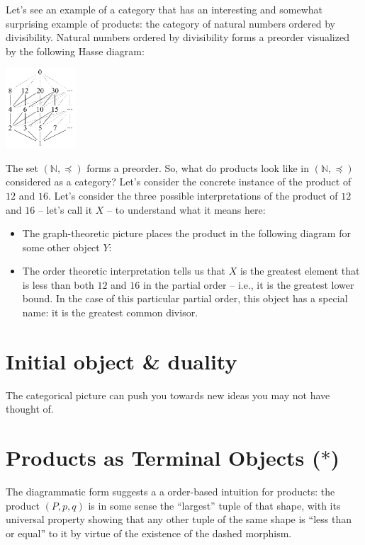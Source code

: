 Let's see an example of a category that has an interesting and somewhat 
surprising example of products: the category of natural numbers 
ordered by divisibility. Natural numbers ordered by divisibility forms 
a preorder visualized by the following Hasse diagram:

\begin{center}
  \includegraphics[width=100px]{fig/divisor_lattice.png}
\end{center}

The set $(\mathbb{N}, \preceq)$ forms a preorder. So,
what do products look like in $(\mathbb{N}, \preceq)$ considered 
as a category?
Let's consider the concrete instance of the product of $12$ 
and $16$. Let's consider the three possible interpretations of 
the product of $12$ and $16$ -- let's call it $X$ -- to understand what it means here:
\begin{itemize}
  \item The graph-theoretic picture places the product
  in the following diagram for some other object $Y$:
  \item The order theoretic interpretation tells us that 
  $X$ is the greatest element that is less than both $12$
  and $16$ in the partial order -- i.e., it is the 
  greatest lower bound. In the case of this particular 
  partial order, this object has a special name: it is the 
  greatest common divisor.
\end{itemize}



\section{Initial object \& duality}
The categorical picture can push you towards new ideas you may not have thought of.

\section{Products as Terminal Objects ($*$)}

The diagrammatic form suggests a
a order-based intuition for products:
the product \((P,p,q)\) is
in some sense the ``largest''
tuple of that shape,
with its universal property
showing that any other tuple of the same shape is
``less than or equal'' to it by virtue of the existence of
the dashed morphism.

